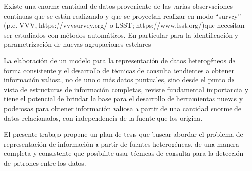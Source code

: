 Existe una enorme cantidad de datos proveniente de las varias observaciones continuas que se están realizando y que se proyectan realizar en modo “survey” (p.e. VVV, https://vvvsurvey.org/ o LSST; https://www.lsst.org/)\revisarcita que necesitan ser estudiados con métodos automáticos. En particular para la identificación y parametrización de nuevas agrupaciones estelares

\cite{schmeja2011identifying}

	\opensacar
	La elaboración de un modelo para la representación de datos heterogéneos de forma consistente y el desarrollo de técnicas de consulta tendientes a obtener información valiosa, no de uno o más datos puntuales, sino desde el punto de vista de estructuras de información completas, reviste fundamental importancia y tiene el potencial de brindar la base para el desarrollo de herramientas nuevas y poderosas para obtener información valiosa a partir de una cantidad enorme de datos relacionados, con independencia de la fuente que los origina.
	
	El presente trabajo propone un plan de tesis que buscar abordar el problema de representación de información a partir de fuentes heterogéneas, de una manera completa y consistente que posibilite usar técnicas de consulta para la detección de patrones entre los datos.
	\closesacar
	
	
	\ampliar \revisarcita

